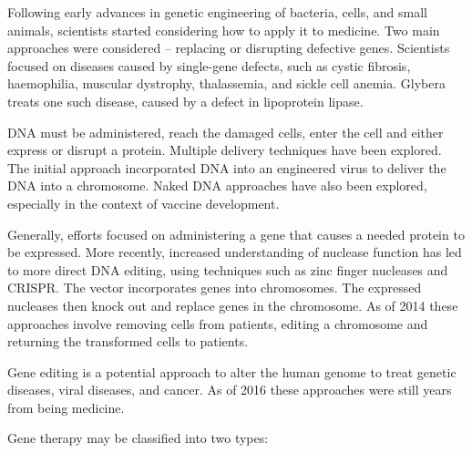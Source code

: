 Following early advances in genetic engineering of bacteria, cells, and small animals, scientists started considering how to apply it to medicine. Two main approaches were considered -- replacing or disrupting defective genes. Scientists focused on diseases caused by single-gene defects, such as cystic fibrosis, haemophilia, muscular dystrophy, thalassemia, and sickle cell anemia. Glybera treats one such disease, caused by a defect in lipoprotein lipase.

DNA must be administered, reach the damaged cells, enter the cell and either express or disrupt a protein. Multiple delivery techniques have been explored. The initial approach incorporated DNA into an engineered virus to deliver the DNA into a chromosome. Naked DNA approaches have also been explored, especially in the context of vaccine development.

Generally, efforts focused on administering a gene that causes a needed protein to be expressed. More recently, increased understanding of nuclease function has led to more direct DNA editing, using techniques such as zinc finger nucleases and CRISPR. The vector incorporates genes into chromosomes. The expressed nucleases then knock out and replace genes in the chromosome. As of 2014 these approaches involve removing cells from patients, editing a chromosome and returning the transformed cells to patients.

Gene editing is a potential approach to alter the human genome to treat genetic diseases, viral diseases, and cancer. As of 2016 these approaches were still years from being medicine.

Gene therapy may be classified into two types:

